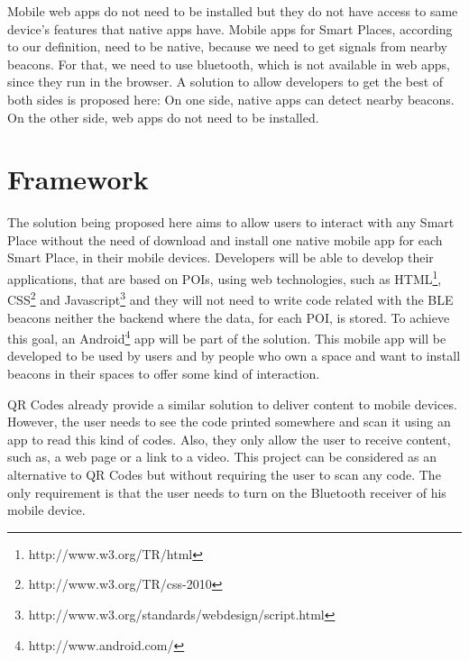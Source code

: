 Mobile web apps do not need to be
installed but they do not have access
to same device's features that native apps have.
Mobile apps for Smart Places, according to our definition,
need to be native, because we need to get signals from
nearby beacons. For that, we need to use bluetooth, which is
not available in web apps, since they run in the browser.
A solution to allow developers to get the best of both sides
is proposed here: On one side,
native apps can detect nearby beacons. On the other side,
web apps do not need to be installed.

\section{Framework}
\label{sub:framework}
The solution being proposed here aims to allow
users to interact with any Smart Place without
the need of download and install one native
mobile app for each Smart Place, in their mobile
devices.
Developers will be able to develop their
applications, that are based on POIs, using
web technologies, such as
HTML\footnote{http://www.w3.org/TR/html},
CSS\footnote{http://www.w3.org/TR/css-2010}
and
Javascript\footnote{http://www.w3.org/standards/webdesign/script.html}
and they will not need to write code related with
the BLE beacons neither the backend where the data,
for each POI, is stored.
To achieve this goal, an
Android\footnote{http://www.android.com/}
app will be part
of the solution. This mobile app will be developed
to be used by users and by people who own a space
and want to install beacons in their spaces to
offer some kind of interaction.

QR Codes already provide a similar solution to
deliver content to mobile devices.
However, the user needs to see the code printed
somewhere and scan it using an app to read
this kind of codes.
Also, they only allow the user to receive content,
such as, a web page or a link to a video.
This project can be considered as an alternative
to QR Codes but without requiring the user
to scan any code. The only requirement is that
the user needs to turn on the Bluetooth receiver
of his mobile device.

